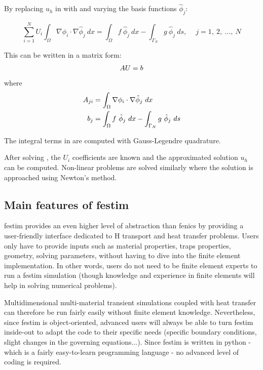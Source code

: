 By replacing $u_h$ in  with  and varying the basis functions $\hat{\phi}_j$:

\begin{equation}
    \sum^N_{i=1} U_i \int_\Omega \nabla \phi_i \cdot \nabla \hat{\phi}_j \ dx = \int_\Omega f \ \hat{\phi}_j \ dx - \int_{\Gamma_N} g \ \hat{\phi}_j \ ds , \quad \ j = 1, \ 2, \ \ldots, \ N
\end{equation}

This can be written in a matrix form:
\begin{equation}
    AU = b
    \labeq{variational problem matrix form}
\end{equation}
where
\begin{subequations}
    \begin{align}
        A_{ji} &= \int_\Omega \nabla \phi_i \cdot \nabla \hat{\phi}_j \ dx \\
        b_{j} &= \int_\Omega f \ \hat{\phi}_j \ dx - \int_{\Gamma_N} g \ \hat{\phi}_j \ ds
    \end{align}
    \labeq{eq: matrices A and b}
\end{subequations}

The integral terms in  are computed with Gauss-Legendre quadrature.

After solving , the $U_i$ coefficients are known and the approximated solution $u_h$ can be computed.
Non-linear problems are solved similarly where the solution is approached using Newton's method.

\subsection{Main features of \gls{festim}}
\gls{festim} provides an even higher level of abstraction than \gls{fenics} by providing a user-friendly interface dedicated to H transport and heat transfer problems.
Users only have to provide inputs such as material properties, traps properties, geometry, solving parameters, without having to dive into the finite element implementation.
In other words, users do not need to be finite element experts to run a \gls{festim} simulation (though knowledge and experience in finite elements will help in solving numerical problems).

Multidimensional multi-material transient simulations coupled with heat transfer can therefore be run fairly easily without finite element knowledge.
Nevertheless, since \gls{festim} is object-oriented, advanced users will always be able to turn \gls{festim} inside-out to adapt the code to their specific needs (specific boundary conditions, slight changes in the governing equations...).
Since \gls{festim} is written in python - which is a fairly easy-to-learn programming language - no advanced level of coding is required.

